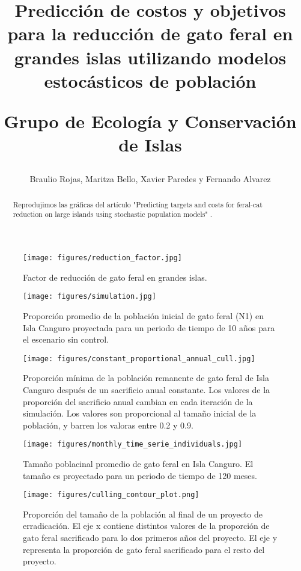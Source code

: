 \documentclass{article} %
\author{Braulio Rojas, Maritza Bello, Xavier Paredes y Fernando Alvarez}
\title{Predicción de costos y objetivos para la reducción de gato feral en grandes islas utilizando
modelos estocásticos de población \\ \begin{large} Grupo de Ecología y Conservación de Islas
\end{large}}
\begin{document}
\maketitle

\begin{abstract}

Reprodujimos las gráficas del artículo "Predicting targets and costs for feral-cat reduction on
large islands using stochastic population models" \cite{venning2021predicting}.

\end{abstract}


\begin{figure}[H]
    \centering
\texttt{[image: figures/reduction\_factor.jpg]}
\caption{Factor de reducción de gato feral en grandes islas.}
\label{fig:reductionFactor}
\end{figure}

\begin{figure}[H]
    \centering
\texttt{[image: figures/simulation.jpg]}
\caption{Proporción promedio de la población inicial de gato feral (N1) en Isla Canguro proyectada para
un periodo de tiempo de 10 años para el escenario sin control.}
\label{fig:simulation}
\end{figure}

\begin{figure}[H]
    \centering
\texttt{[image: figures/constant\_proportional\_annual\_cull.jpg]}
\caption{Proporción mínima de la población remanente de gato feral de Isla Canguro después de
	un sacrificio anual constante. Los valores de la proporción del sacrificio anual cambian en cada
    iteración de la simulación. Los valores son proporcional al tamaño inicial de la población, y 
    barren los valoras entre 0.2 y 0.9.}
\label{fig:constantProportionalAnnualCull}
\end{figure}

\begin{figure}[H]
    \centering
\texttt{[image: figures/monthly\_time\_serie\_individuals.jpg]}
\caption{Tamaño poblacinal promedio de gato feral en Isla Canguro. El tamaño es proyectado para un
periodo de tiempo de 120 meses.}
\label{fig:monthlyTimeSerieIndividuals}
\end{figure}

\begin{figure}[H]
\centering
\texttt{[image: figures/culling\_contour\_plot.png]}
\caption{Proporción del tamaño de la población al final de un proyecto de erradicación. El eje x
contiene distintos valores de la proporción de gato feral sacrificado para lo dos primeros años del
proyecto. El eje y representa la proporción de gato feral sacrificado para el resto del proyecto.}
\label{fig:culling_contour_plot}
\end{figure}
\end{document}

